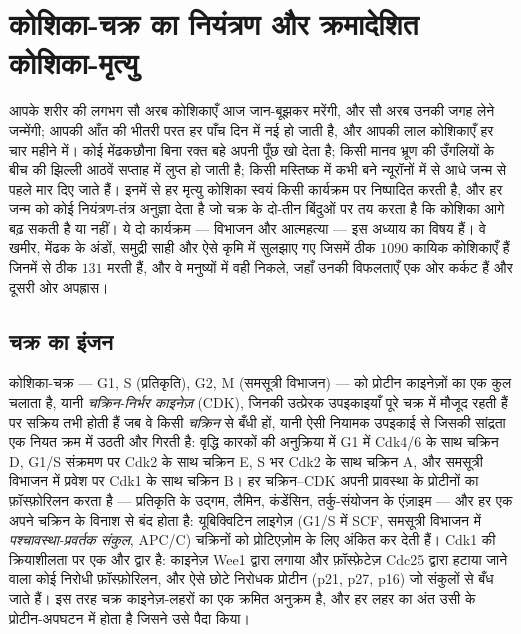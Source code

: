 \chapter{कोशिका-चक्र का नियंत्रण और क्रमादेशित कोशिका-मृत्यु}\label{ch:b3:cell-cycle-apoptosis}

आपके शरीर की लगभग सौ अरब कोशिकाएँ आज जान-बूझकर मरेंगी, और सौ अरब उनकी
जगह लेने जन्मेंगी; आपकी आँत की भीतरी परत हर पाँच दिन में नई हो जाती है,
और आपकी लाल कोशिकाएँ हर चार महीने में। कोई मेंढकछौना बिना रक्त बहे अपनी
पूँछ खो देता है; किसी मानव भ्रूण की उँगलियों के बीच की झिल्ली आठवें
सप्ताह में लुप्त हो जाती है; किसी मस्तिष्क में कभी बने न्यूरॉनों में से
आधे जन्म से पहले मार दिए जाते हैं। इनमें से हर मृत्यु कोशिका स्वयं किसी
कार्यक्रम पर निष्पादित करती है, और हर जन्म को कोई नियंत्रण-तंत्र
अनुज्ञा देता है जो चक्र के दो-तीन बिंदुओं पर तय करता है कि कोशिका आगे
बढ़ सकती है या नहीं। ये दो कार्यक्रम --- विभाजन और आत्महत्या --- इस
अध्याय का विषय हैं। वे खमीर, मेंढक के अंडों, समुद्री साही और ऐसे कृमि
में सुलझाए गए जिसमें ठीक $1090$ कायिक कोशिकाएँ हैं जिनमें से ठीक $131$
मरती हैं, और वे मनुष्यों में वही निकले, जहाँ उनकी विफलताएँ एक ओर कर्कट
हैं और दूसरी ओर अपह्रास।

\section{चक्र का इंजन}

\begin{definition}[चक्रिन और चक्रिन-निर्भर काइनेज़]\label{def:b3:cell-cycle-apoptosis:cdk}
कोशिका-चक्र --- G1, S (प्रतिकृति), G2, M (समसूत्री विभाजन) --- को
प्रोटीन काइनेज़ों का एक कुल चलाता है, यानी \emph{चक्रिन-निर्भर काइनेज़}
(CDK), जिनकी उत्प्रेरक उपइकाइयाँ पूरे चक्र में मौजूद रहती हैं पर सक्रिय
तभी होती हैं जब वे किसी \emph{चक्रिन} से बँधी हों, यानी ऐसी नियामक
उपइकाई से जिसकी सांद्रता एक नियत क्रम में उठती और गिरती है: वृद्धि
कारकों की अनुक्रिया में G1 में Cdk4/6 के साथ चक्रिन D, G1/S संक्रमण पर
Cdk2 के साथ चक्रिन E, S भर Cdk2 के साथ चक्रिन A, और समसूत्री विभाजन में
प्रवेश पर Cdk1 के साथ चक्रिन B। हर चक्रिन--CDK अपनी प्रावस्था के
प्रोटीनों का फ़ॉस्फ़ोरिलन करता है --- प्रतिकृति के उद्गम, लैमिन,
कंडेंसिन, तर्कु-संयोजन के एंज़ाइम --- और हर एक अपने चक्रिन के विनाश से
बंद होता है: यूबिक्विटिन लाइगेज़ (G1/S में SCF, समसूत्री विभाजन में
\emph{पश्चावस्था-प्रवर्तक संकुल}, APC/C) चक्रिनों को प्रोटिएज़ोम के लिए
अंकित कर देती हैं। Cdk1 की क्रियाशीलता पर एक और द्वार है: काइनेज़ Wee1
द्वारा लगाया और फ़ॉस्फ़ेटेज़ Cdc25 द्वारा हटाया जाने वाला कोई निरोधी
फ़ॉस्फ़ोरिलन, और ऐसे छोटे निरोधक प्रोटीन (p21, p27, p16) जो संकुलों से
बँध जाते हैं। इस तरह चक्र काइनेज़-लहरों का एक क्रमित अनुक्रम है, और हर
लहर का अंत उसी के प्रोटीन-अपघटन में होता है जिसने उसे पैदा किया।
\end{definition}

